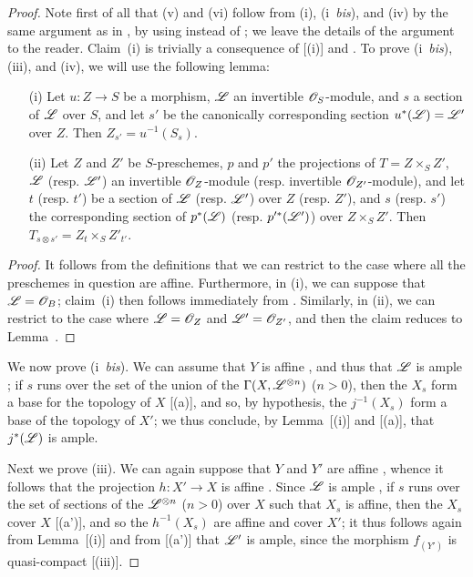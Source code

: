 \begin{proof}
Note first of all that (v) and (vi) follow from (i), (i~\emph{bis}), and (iv) by the same argument as in , by using  instead of ;
we leave the details of the argument to the reader.
Claim~(i) is trivially a consequence of [(i)] and .
To prove (i~\emph{bis}), (iii), and (iv), we will use the following lemma:
  \begin{lemma}[4.6.13.1]
  \label{II.4.6.13.1}
  \begin{enumerate}
    \item[\rm{(i)}] Let $u:Z\to S$ be a morphism, $\mathscr{L}$ an invertible $\mathscr{O}_S$-module, and $s$ a section of $\mathscr{L}$ over $S$, and let $s'$ be the canonically corresponding section $u^*(\mathscr{L})=\mathscr{L}'$ over $Z$.
      Then $Z_{s'}=u^{-1}(S_s)$.
    \item[\rm{(ii)}] Let $Z$ and $Z'$ be $S$-preschemes, $p$ and $p'$ the projections of $T=Z\times_S Z'$, $\mathscr{L}$ (resp. $\mathscr{L}'$) an invertible $\mathscr{O}_Z$-module (resp. invertible $\mathscr{O}_{Z'}$-module), and let $t$ (resp. $t'$) be a section of $\mathscr{L}$ (resp. $\mathscr{L}'$) over $Z$ (resp. $Z'$), and $s$ (resp. $s'$) the corresponding section of $p^*(\mathscr{L})$ (resp. $p'^*(\mathscr{L}')$) over $Z\times_S Z'$.
      Then $T_{s\otimes s'}=Z_t\times_S Z'_{t'}$.
  \end{enumerate}
  \end{lemma}

  \begin{proof}
  It follows from the definitions that we can restrict to the case where all the preschemes in question are affine.
  Furthermore, in (i), we can suppose that $\mathscr{L}=\mathscr{O}_B$;
  claim~(i) then follows immediately from .
  Similarly, in (ii), we can restrict to the case where $\mathscr{L}=\mathscr{O}_Z$ and $\mathscr{L}'=\mathscr{O}_{Z'}$, and then the claim reduces to Lemma~.
  \end{proof}

We now prove (i~\emph{bis}).
We can assume that $Y$ is affine , and thus that $\mathscr{L}$ is ample ;
if $s$ runs over the set of the union of the $\Gamma(X,\mathscr{L}^{\otimes n})$ ($n>0$), then the $X_s$ form a base for the topology of $X$ [(a)], and so, by hypothesis, the $j^{-1}(X_s)$ form a base of the topology of $X'$;
we thus conclude, by Lemma~[(i)] and [(a)], that $j^*(\mathscr{L})$ is ample.

Next we prove (iii).
We can again suppose that $Y$ and $Y'$ are affine , whence it follows that the projection $h:X'\to X$ is affine .
Since $\mathscr{L}$ is ample , if $s$ runs over the set of sections of the $\mathscr{L}^{\otimes n}$ ($n>0$) over $X$ such that $X_s$ is affine, then the $X_s$ cover $X$ [(a')], and so the $h^{-1}(X_s)$ are affine  and cover $X'$;
it thus follows again from Lemma~[(i)] and from [(a')] that $\mathscr{L}'$ is ample, since the morphism $f_{(Y')}$ is quasi-compact [(iii)].


\end{proof}
